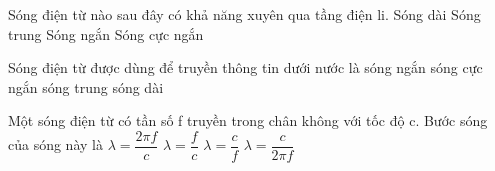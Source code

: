 \begin{ex}%
Sóng điện từ nào sau đây có khả năng xuyên qua tầng điện li.
\choice
{Sóng dài}
{Sóng trung}
{Sóng ngắn}
{\True Sóng cực ngắn}
\end{ex} 
\begin{ex}%
Sóng điện từ được dùng để truyền thông tin dưới nước là
\choice
{sóng ngắn}
{sóng cực ngắn}
{sóng trung}
{\True sóng dài}
\end{ex} 
\begin{ex}%
 Một sóng điện từ có tần số f truyền trong chân không với tốc độ c. Bước sóng của sóng này là
\choice
{$\lambda =\dfrac{2\pi f}{c}$}
{$\lambda =\dfrac{f}{c}$}
{\True $\lambda =\dfrac{c}{f}$}
{$\lambda =\dfrac{c}{2\pi f} $}
\end{ex} 
